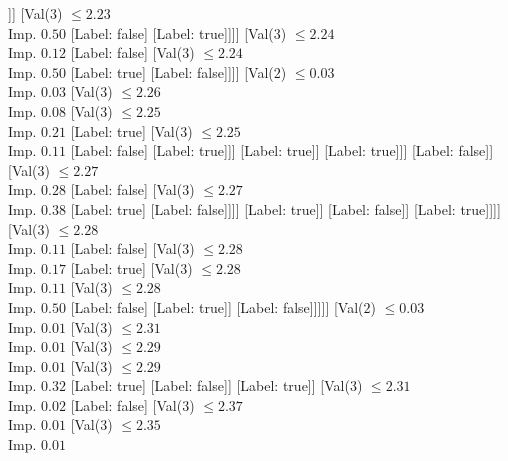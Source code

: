 \documentclass[margin=10pt]{standalone}
\begin{document}
\begin{forest}
																					]]
																			[Val($3$) $ \leq 2.23$ \\ Imp. $0.50$
																				[Label: false]
																				[Label: true]]]]
																	[Val($3$) $ \leq 2.24$ \\ Imp. $0.12$
																		[Label: false]
																		[Val($3$) $ \leq 2.24$ \\ Imp. $0.50$
																			[Label: true]
																			[Label: false]]]]
																[Val($2$) $ \leq 0.03$ \\ Imp. $0.03$
																	[Val($3$) $ \leq 2.26$ \\ Imp. $0.08$
																		[Val($3$) $ \leq 2.25$ \\ Imp. $0.21$
																			[Label: true]
																			[Val($3$) $ \leq 2.25$ \\ Imp. $0.11$
																				[Label: false]
																				[Label: true]]]
																		[Label: true]]
																	[Label: true]]]
															[Label: false]]
														[Val($3$) $ \leq 2.27$ \\ Imp. $0.28$
															[Label: false]
															[Val($3$) $ \leq 2.27$ \\ Imp. $0.38$
																[Label: true]
																[Label: false]]]]
													[Label: true]]
												[Label: false]]
											[Label: true]]]]
								[Val($3$) $ \leq 2.28$ \\ Imp. $0.11$
									[Label: false]
									[Val($3$) $ \leq 2.28$ \\ Imp. $0.17$
										[Label: true]
										[Val($3$) $ \leq 2.28$ \\ Imp. $0.11$
											[Val($3$) $ \leq 2.28$ \\ Imp. $0.50$
												[Label: false]
												[Label: true]]
											[Label: false]]]]]
							[Val($2$) $ \leq 0.03$ \\ Imp. $0.01$
								[Val($3$) $ \leq 2.31$ \\ Imp. $0.01$
									[Val($3$) $ \leq 2.29$ \\ Imp. $0.01$
										[Val($3$) $ \leq 2.29$ \\ Imp. $0.32$
											[Label: true]
											[Label: false]]
										[Label: true]]
									[Val($3$) $ \leq 2.31$ \\ Imp. $0.02$
										[Label: false]
										[Val($3$) $ \leq 2.37$ \\ Imp. $0.01$
											[Val($3$) $ \leq 2.35$ \\ Imp. $0.01$

\end{forest}
\end{document}
